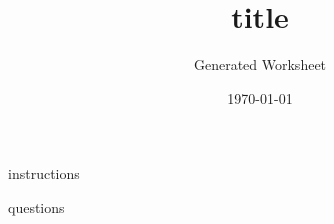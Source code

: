 \documentclass{article}
\begin{document}
\title{ {{title}} }
\author{Generated Worksheet}
\date{\today}

\maketitle

{{instructions}}

\begin{enumerate}
{{questions}}
\end{enumerate}
\end{document}

